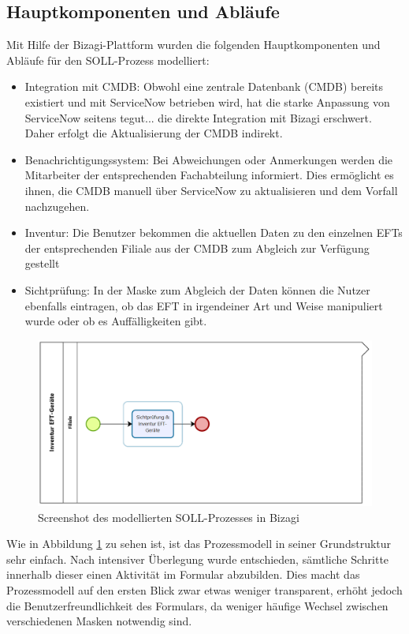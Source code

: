 \documentclass[12pt, a4paper]{article}
\begin{document}
\subsection{Hauptkomponenten und Abläufe}

Mit Hilfe der Bizagi-Plattform wurden die folgenden Hauptkomponenten und Abläufe für den SOLL-Prozess modelliert:

\begin{itemize}
\item Integration mit CMDB: Obwohl eine zentrale Datenbank (CMDB) bereits existiert und mit ServiceNow betrieben wird, hat die starke Anpassung von ServiceNow seitens tegut... 
die direkte Integration mit Bizagi erschwert. Daher erfolgt die Aktualisierung der CMDB indirekt.
\item Benachrichtigungssystem: Bei Abweichungen oder Anmerkungen werden die Mitarbeiter der entsprechenden Fachabteilung informiert. Dies ermöglicht es ihnen, die 
CMDB manuell über ServiceNow zu aktualisieren und dem Vorfall nachzugehen.
\item Inventur: Die Benutzer bekommen die aktuellen Daten zu den einzelnen EFTs der entsprechenden Filiale aus der CMDB zum Abgleich zur Verfügung gestellt
\item Sichtprüfung: In der Maske zum Abgleich der Daten können die Nutzer ebenfalls eintragen, ob das EFT in irgendeiner Art und Weise manipuliert wurde oder ob es Auffälligkeiten gibt. 
\end{itemize}

\begin{figure}[h]
    \centering
    \includegraphics[width=\textwidth]{images/process.png}
    \caption{Screenshot des modellierten SOLL-Prozesses in Bizagi}
    \label{fig:soll_process}
\end{figure}

Wie in Abbildung \ref{fig:soll_process} zu sehen ist, ist das Prozessmodell in seiner Grundstruktur sehr einfach. Nach intensiver Überlegung wurde entschieden, 
sämtliche Schritte innerhalb dieser einen Aktivität im Formular abzubilden. Dies macht das Prozessmodell auf den ersten Blick zwar etwas weniger transparent, erhöht 
jedoch die Benutzerfreundlichkeit des Formulars, da weniger häufige Wechsel zwischen verschiedenen Masken notwendig sind.
\end{document}
